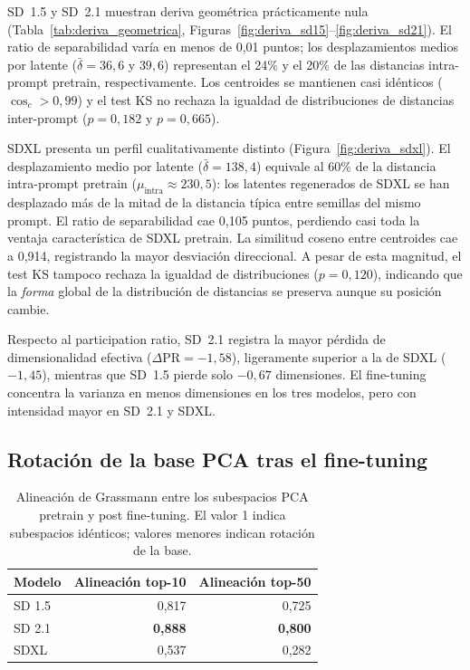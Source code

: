 \documentclass[12pt, a4paper, twoside]{book}
\begin{document}
SD~1.5 y SD~2.1 muestran deriva geométrica prácticamente nula (Tabla~\ref{tab:deriva_geometrica},
Figuras~\ref{fig:deriva_sd15}--\ref{fig:deriva_sd21}).
El ratio de separabilidad varía en menos de 0,01 puntos; los desplazamientos medios por latente
($\bar{\delta} = 36{,}6$ y $39{,}6$) representan el 24\% y el 20\% de las distancias intra-prompt
pretrain, respectivamente. Los centroides se mantienen casi idénticos ($\cos_c > 0{,}99$) y el
test KS no rechaza la igualdad de distribuciones de distancias inter-prompt ($p = 0{,}182$ y
$p = 0{,}665$).

SDXL presenta un perfil cualitativamente distinto (Figura~\ref{fig:deriva_sdxl}).
El desplazamiento medio por latente ($\bar{\delta} = 138{,}4$) equivale al 60\% de la distancia
intra-prompt pretrain ($\mu_\text{intra} \approx 230{,}5$): los latentes regenerados de SDXL se han
desplazado más de la mitad de la distancia típica entre semillas del mismo prompt.
El ratio de separabilidad cae 0,105 puntos, perdiendo casi toda la ventaja característica de
SDXL pretrain.
La similitud coseno entre centroides cae a 0,914, registrando la mayor desviación direccional.
A pesar de esta magnitud, el test KS tampoco rechaza la igualdad de distribuciones
($p = 0{,}120$), indicando que la \emph{forma} global de la distribución de distancias se
preserva aunque su posición cambie.

Respecto al participation ratio, SD~2.1 registra la mayor pérdida de dimensionalidad efectiva
($\Delta\text{PR} = -1{,}58$), ligeramente superior a la de SDXL ($-1{,}45$), mientras que
SD~1.5 pierde solo $-0{,}67$ dimensiones. El fine-tuning concentra la varianza en menos
dimensiones en los tres modelos, pero con intensidad mayor en SD~2.1 y SDXL.

\subsection{Rotación de la base PCA tras el fine-tuning}
\label{subsec:res:pca_alineacion}

\begin{table}[htb]
\centering
\caption{Alineación de Grassmann entre los subespacios PCA pretrain y post fine-tuning.
El valor 1 indica subespacios idénticos; valores menores indican rotación de la base.}
\label{tab:pca_alineacion}
\small
\begin{tabular}{lrr}
\toprule
\textbf{Modelo} & \textbf{Alineación top-10} & \textbf{Alineación top-50} \\
\midrule
SD 1.5 & 0,817 & 0,725 \\
SD 2.1 & \textbf{0,888} & \textbf{0,800} \\
SDXL   & 0,537 & 0,282 \\
\bottomrule
\end{tabular}
\end{table}
\end{document}
